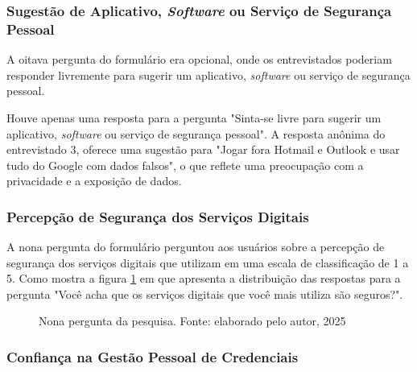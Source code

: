 \documentclass[12pt]{article}
\begin{document}
\subsubsection{Sugestão de Aplicativo, \textit{Software} ou Serviço de Segurança Pessoal}

A oitava pergunta do formulário era opcional, onde os entrevistados poderiam responder
livremente para sugerir um aplicativo, \textit{software} ou serviço de segurança pessoal.

Houve apenas uma resposta para a pergunta "Sinta-se livre para sugerir um aplicativo,
\textit{software} ou serviço de segurança pessoal".
A resposta anônima do entrevistado 3, oferece uma sugestão para "Jogar fora Hotmail
e Outlook e usar tudo do Google com dados falsos", o que reflete uma preocupação com a
privacidade e a exposição de dados.

\subsubsection{Percepção de Segurança dos Serviços Digitais}

A nona pergunta do formulário perguntou aos usuários sobre a percepção de segurança dos serviços
digitais que utilizam em uma escala de classificação de 1 a 5.
Como mostra a figura \ref{fig:resposta_9} em que apresenta a distribuição das
respostas para a pergunta "Você acha que os serviços digitais que você mais utiliza são seguros?".

\begin{figure}[htb]
    \centering
    \caption{Nona pergunta da pesquisa. Fonte: elaborado pelo autor, 2025}
    \label{fig:resposta_9}
\end{figure}
\FloatBarrier

\subsubsection{Confiança na Gestão Pessoal de Credenciais}
\end{document}
